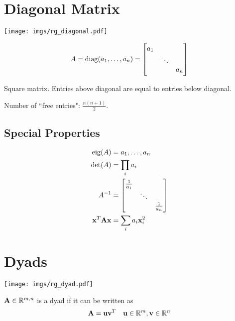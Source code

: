 \section{Diagonal Matrix}

\begin{center}
\texttt{[image: imgs/rg\_diagonal.pdf]}
\end{center}

\begin{equation}
A=\operatorname{diag}(a_1,\ldots,a_n)=
\begin{bmatrix}
a_1  &        &  \\
     & \ddots &  \\
     &        & a_n 
\end{bmatrix}
\end{equation}

Square matrix. Entries above diagonal are equal to entries below diagonal.

Number of ``free entries": $\frac{n(n+1)}{2}$.

\subsection*{Special Properties}

\begin{align}
\operatorname{eig}(A) &= {a_1,\ldots,a_n}           \\
\det(A) &= \prod_i a_i                \\
A^{-1}  &= 
\begin{bmatrix}
\frac{1}{a_1} &        &               \\
              & \ddots &               \\
              &        & \frac{1}{a_n}
\end{bmatrix} \\
\mathbf{x}^T \mathbf{A} \mathbf{x} &= \sum_i a_i \mathbf{x}_i^2     \\
\end{align}




\section{Dyads}

\begin{center}
\texttt{[image: imgs/rg\_dyad.pdf]}
\end{center}

$\mathbf{A}\in\mathbb{R}^{m,n}$ is a dyad if it can be written as
\begin{equation}
\mathbf{A}=\mathbf{u}\mathbf{v}^T~~~\mathbf{u}\in\mathbb{R}^{m}, \mathbf{v}\in\mathbb{R}^{n}
\end{equation}

